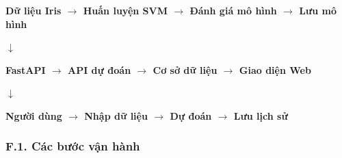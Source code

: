 \documentclass[14pt]{extarticle}
\begin{document}
	\begin{center}
		\textbf{
			Dữ liệu Iris
			$\rightarrow$
			Huấn luyện SVM
			$\rightarrow$
			Đánh giá mô hình
			$\rightarrow$
			Lưu mô hình
		}
	\end{center}
	
	\begin{center}
		\textbf{
			$\downarrow$
		}
	\end{center}
	
	\begin{center}
		\textbf{
			FastAPI
			$\rightarrow$
			API dự đoán
			$\rightarrow$
			Cơ sở dữ liệu
			$\rightarrow$
			Giao diện Web
		}
	\end{center}
	
	\begin{center}
		\textbf{
			$\downarrow$
		}
	\end{center}
	
	\begin{center}
		\textbf{
			Người dùng
			$\rightarrow$
			Nhập dữ liệu
			$\rightarrow$
			Dự đoán
			$\rightarrow$
			Lưu lịch sử
		}
	\end{center}
	
	\subsubsection*{F.1. Các bước vận hành}
	
\end{document}
